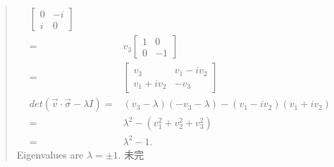 \documentclass[UTF8]{ctexart}
\begin{document}
\begin{quote}
\begin{equation}
\begin{aligned}
\begin{bmatrix}
							0 &-i \\i & 0
						\end{bmatrix}\\
						=&v_{3}\begin{bmatrix}
							1 &0 \\0 & -1
						\end{bmatrix} \\
						=&\begin{bmatrix}
							v_{3} & v_{1}-iv_{2} \\
							v_{1}+iv_{2} & -v_{3}
						\end{bmatrix} \\
	det(\vec{v}\cdot\vec{\sigma}-\lambda I)=&(v_{3}-\lambda)(-v_{3}-\lambda)
										  -(v_{1}-iv_{2})(v_{1}+iv_{2}) \\
										  =&\lambda^{2}-(v_{1}^{2}+v_{2}^{2}+v_{3}^{2}) \\
										  =&\lambda^{2}-1.
	\end{aligned}
	\end{equation}
	Eigenvalues are $λ = \pm1.$
未完

\end{quote}
\end{document}
